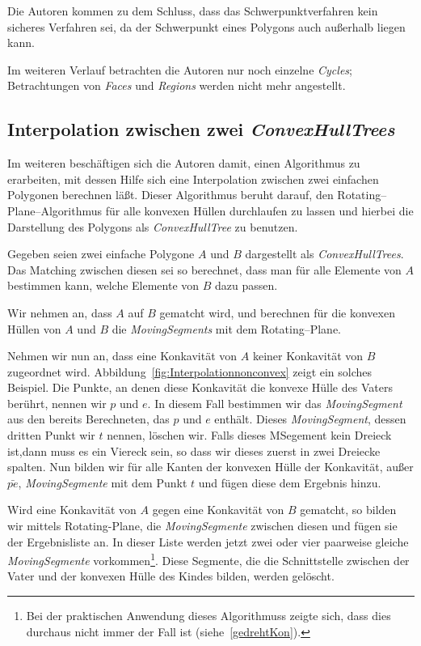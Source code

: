 Die Autoren kommen zu dem Schluss, dass das Schwerpunktverfahren kein sicheres Verfahren sei, da der Schwerpunkt eines Polygons auch außerhalb liegen kann.

Im weiteren Verlauf betrachten die Autoren nur noch einzelne \textit{Cycles}; Betrachtungen von \textit{Faces} und \textit{Regions} werden nicht mehr angestellt.

\subsection{Interpolation zwischen zwei \textit{ConvexHullTrees}}

Im weiteren beschäftigen sich die Autoren damit, einen Algorithmus zu erarbeiten, mit dessen Hilfe sich eine Interpolation zwischen zwei einfachen Polygonen berechnen läßt. Dieser Algorithmus beruht darauf, den Rotating--Plane--Algorithmus für alle konvexen Hüllen durchlaufen zu lassen und hierbei die Darstellung des Polygons als \textit{ConvexHullTree} zu benutzen.

Gegeben seien  zwei einfache Polygone $A$ und $B$ dargestellt als \textit{ConvexHullTrees}. Das Matching zwischen diesen sei so berechnet, dass man für alle Elemente von $A$ bestimmen kann, welche Elemente von $B$ dazu passen.

Wir nehmen an, dass $A$ auf $B$ gematcht wird, und berechnen für die konvexen Hüllen von $A$ und $B$ die \textit{MovingSegments} mit dem  Rotating--Plane. 

Nehmen wir nun an, dass eine Konkavität von $A$ keiner Konkavität von $B$ zugeordnet wird. Abbildung~\vref{fig:Interpolationnonconvex} zeigt ein solches Beispiel. Die Punkte, an denen diese Konkavität die konvexe Hülle des Vaters berührt, nennen wir $p$ und $e$. In diesem Fall bestimmen wir das \textit{MovingSegment} aus den bereits Berechneten, das $p$ und $e$ enthält. Dieses \textit{MovingSegment}, dessen dritten Punkt wir $t$ nennen, löschen wir. Falls dieses MSegement kein Dreieck ist,dann muss es ein Viereck sein, so dass wir dieses zuerst in zwei Dreiecke spalten. Nun bilden wir für alle Kanten der konvexen Hülle der Konkavität, außer $\bar{pe}$, \textit{MovingSegmente} mit dem Punkt $t$ und fügen diese dem Ergebnis hinzu.

Wird eine Konkavität von $A$ gegen eine Konkavität von $B$ gematcht, so bilden wir mittels Rotating-Plane, die \textit{MovingSegmente} zwischen diesen und fügen sie der Ergebnisliste an. In dieser Liste werden jetzt zwei oder vier paarweise gleiche \textit{MovingSegmente} vorkommen\footnote{Bei der praktischen Anwendung dieses Algorithmuss zeigte sich, dass dies durchaus nicht immer der Fall ist (siehe~\vref{gedrehtKon}).}. Diese Segmente, die die Schnittstelle zwischen der Vater und der konvexen Hülle des Kindes bilden, werden gelöscht. 

